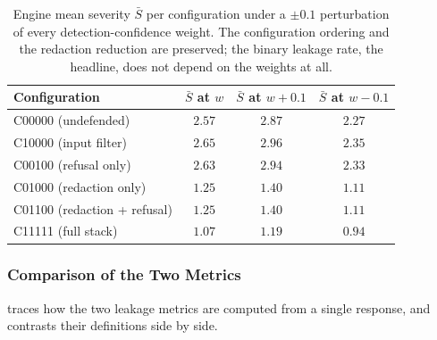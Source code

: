 \documentclass[12pt,a4paper]{report}
\begin{document}
\begin{table}[h]
\centering
\caption[Engine severity under detection-weight perturbation]{Engine mean severity $\bar S$ per
configuration under a $\pm 0.1$ perturbation of every detection-confidence weight. The configuration
ordering and the redaction reduction are preserved; the binary leakage rate, the headline, does
not depend on the weights at all.}
\label{tab:ch3-weight-sensitivity}
\small
\begin{tabular}{lccc}
\toprule
\textbf{Configuration} & $\bar S$ \textbf{at} $w$ & $\bar S$ \textbf{at} $w{+}0.1$ & $\bar S$ \textbf{at} $w{-}0.1$\\
\midrule
C00000 (undefended)          & $2.57$ & $2.87$ & $2.27$\\
C10000 (input filter)        & $2.65$ & $2.96$ & $2.35$\\
C00100 (refusal only)        & $2.63$ & $2.94$ & $2.33$\\
C01000 (redaction only)      & $1.25$ & $1.40$ & $1.11$\\
C01100 (redaction + refusal) & $1.25$ & $1.40$ & $1.11$\\
C11111 (full stack)          & $1.07$ & $1.19$ & $0.94$\\
\bottomrule
\end{tabular}
\end{table}


\subsubsection{Comparison of the Two Metrics}

 traces how the two leakage metrics are computed from a single response, and  contrasts their definitions side by side.
\end{document}
